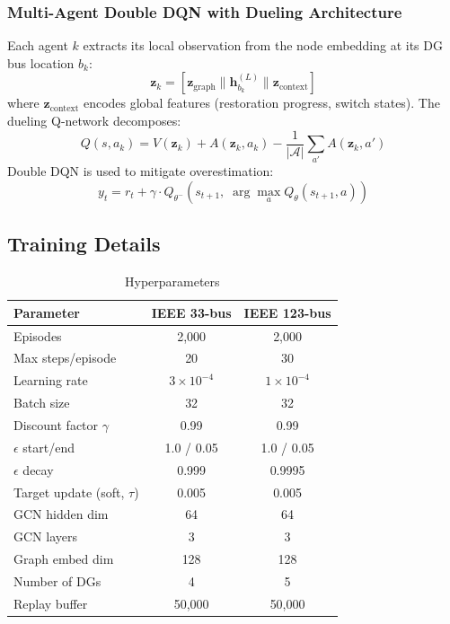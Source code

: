 \documentclass[11pt]{article}
\begin{document}
\subsubsection{Multi-Agent Double DQN with Dueling Architecture}
Each agent $k$ extracts its local observation from the node embedding at its DG bus location $b_k$:
\begin{equation}
    \mathbf{z}_k = [\mathbf{z}_{\text{graph}} \| \mathbf{h}_{b_k}^{(L)} \| \mathbf{z}_{\text{context}}]
\end{equation}
where $\mathbf{z}_{\text{context}}$ encodes global features (restoration progress, switch states). The dueling Q-network decomposes:
\begin{equation}
    Q(s, a_k) = V(\mathbf{z}_k) + A(\mathbf{z}_k, a_k) - \frac{1}{|\mathcal{A}|}\sum_{a'} A(\mathbf{z}_k, a')
\end{equation}
Double DQN is used to mitigate overestimation:
\begin{equation}
    y_t = r_t + \gamma \cdot Q_{\theta^-}\!\left(s_{t+1},\; \arg\max_{a} Q_\theta(s_{t+1}, a)\right)
\end{equation}

\subsection{Training Details}

\begin{table}[H]
\centering
\caption{Hyperparameters}
\label{tab:hyperparams}
\small
\begin{tabular}{@{}lcc@{}}
\toprule
\textbf{Parameter} & \textbf{IEEE 33-bus} & \textbf{IEEE 123-bus} \\
\midrule
Episodes & 2,000 & 2,000 \\
Max steps/episode & 20 & 30 \\
Learning rate & $3 \times 10^{-4}$ & $1 \times 10^{-4}$ \\
Batch size & 32 & 32 \\
Discount factor $\gamma$ & 0.99 & 0.99 \\
$\epsilon$ start/end & 1.0 / 0.05 & 1.0 / 0.05 \\
$\epsilon$ decay & 0.999 & 0.9995 \\
Target update (soft, $\tau$) & 0.005 & 0.005 \\
GCN hidden dim & 64 & 64 \\
GCN layers & 3 & 3 \\
Graph embed dim & 128 & 128 \\
Number of DGs & 4 & 5 \\
Replay buffer & 50,000 & 50,000 \\
\bottomrule
\end{tabular}
\end{table}
\end{document}
